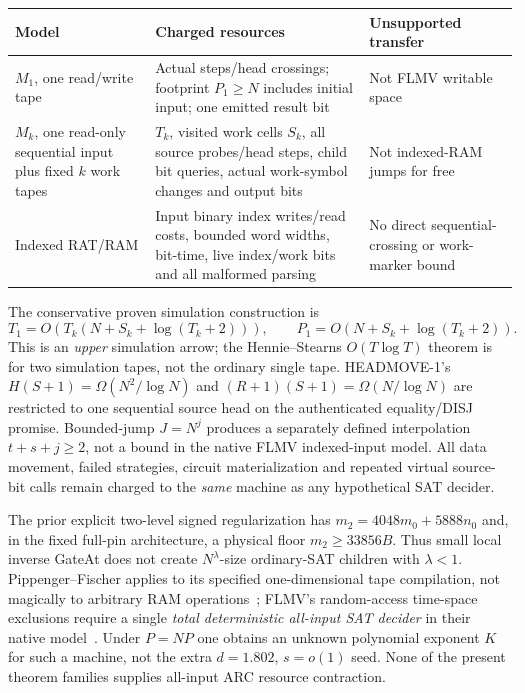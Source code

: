 \documentclass[11pt]{article}
\begin{document}
\begin{center}\small
\begin{tabularx}{.97\linewidth}{p{.16\linewidth}X X}
\toprule
Model& Charged resources & Unsupported transfer\\\midrule
$M_1$, one read/write tape&Actual steps/head crossings; footprint $P_1\ge N$ includes initial input; one emitted result bit&Not FLMV writable space\\
$M_k$, one read-only sequential input plus fixed $k$ work tapes&$T_k$, visited work cells $S_k$, all source probes/head steps, child bit queries, actual work-symbol changes and output bits&Not indexed-RAM jumps for free\\
Indexed RAT/RAM&Input binary index writes/read costs, bounded word widths, bit-time, live index/work bits and all malformed parsing&No direct sequential-crossing or work-marker bound\\\bottomrule
\end{tabularx}
\end{center}
The conservative proven simulation construction is
\[
 T_1=O\!\left(T_k(N+S_k+\log(T_k+2))\right),\qquad
 P_1=O\!\left(N+S_k+\log(T_k+2)\right).
\]
This is an \emph{upper} simulation arrow; the Hennie--Stearns $O(T\log T)$ theorem is for two simulation tapes, not the ordinary single tape. HEADMOVE-1's $H(S+1)=\Omega(N^2/\log N)$ and $(R+1)(S+1)=\Omega(N/\log N)$ are restricted to one sequential source head on the authenticated equality/DISJ promise. Bounded-jump $J=N^j$ produces a separately defined interpolation $t+s+j\ge2$, not a bound in the native FLMV indexed-input model. All data movement, failed strategies, circuit materialization and repeated virtual source-bit calls remain charged to the \emph{same} machine as any hypothetical SAT decider.

The prior explicit two-level signed regularization has $m_2=4048m_0+5888n_0$ and, in the fixed full-pin architecture, a physical floor $m_2\ge33856B$. Thus small local inverse GateAt does not create $N^\lambda$-size ordinary-SAT children with $\lambda<1$. Pippenger--Fischer applies to its specified one-dimensional tape compilation, not magically to arbitrary RAM operations~\cite{PF}; FLMV's random-access time-space exclusions require a single \emph{total deterministic all-input SAT decider} in their native model~\cite{FLMV}. Under $P=NP$ one obtains an unknown polynomial exponent $K$ for such a machine, not the extra $d=1.802$, $s=o(1)$ seed. None of the present theorem families supplies all-input ARC resource contraction.
\end{document}

